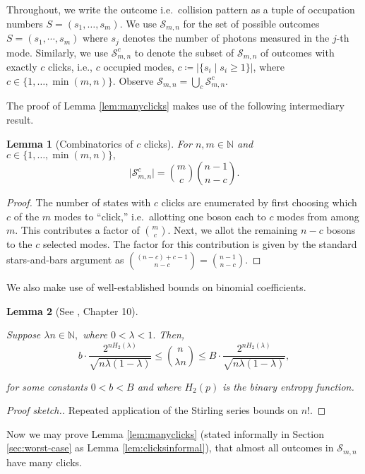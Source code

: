\documentclass[11pt]{article}
\theoremstyle{plain}
\theoremstyle{plain}
\newtheorem{lem}{Lemma}
\theoremstyle{plain}
\theoremstyle{plain}
\theoremstyle{plain}
\theoremstyle{plain}
\theoremstyle{plain}
\theoremstyle{remark}
\theoremstyle{remark}
\theoremstyle{plain}
\theoremstyle{plain}
\theoremstyle{plain}
\theoremstyle{plain}
\newcommand{\Scmn}{\mathcal{S}^c_{m,n}}
\begin{document}
Throughout, we write the outcome i.e.\ collision pattern as a tuple of occupation numbers $S = (s_1,\ldots,s_m).$ 
We use $\mathcal S_{m,n}$ for the set of possible outcomes $S=(s_1,\cdots,s_m)$ where $s_j$ denotes the number of photons measured in the $j$-th mode. Similarly, we use $\mathcal{S}^c_{m,n}$ to denote the subset of $\mathcal{S}_{m,n}$ of outcomes with exactly $c$ clicks, i.e., $c$ occupied modes, $c \coloneqq \lvert \{s_i \mid s_i\geq 1\}\rvert $, where $c\in\{1,\ldots,\min(m,n)\}.$ Observe $\mathcal{S}_{m,n} = \bigcup_{c} \mathcal{S}^c_{m,n}.$

The proof of Lemma \ref{lem:manyclicks} makes use of the following intermediary result.

\begin{lem}[Combinatorics of $c$ clicks]\label{lem:states-with-c-clicks}
    For $n,m \in \mathbb{N}$ and $c\in\{1,\ldots,\min(m,n)\},$ \[\lvert \Scmn \rvert = \binom{m}{c} \binom{n-1}{n-c}.\]
\end{lem}

\begin{proof}
The number of states with $c$ clicks are enumerated by first choosing which $c$ of the $m$ modes to ``click,'' i.e.\ allotting one boson each to $c$ modes from among $m.$ This contributes a factor of $\binom{m}{c}.$ Next, we allot the remaining $n-c$ bosons to the $c$ selected modes. The factor for this contribution is given by the standard stars-and-bars argument as $\binom{(n-c)+ c - 1}{n - c} = \binom{n-1}{n-c}.$
\end{proof}

We also make use of well-established bounds on binomial coefficients.

\begin{lem}[See \cite{MacWilliams}, Chapter 10]\label{lem:binomial-bounds}

Suppose $\lambda n \in \mathbb{N},$ where $0<\lambda < 1.$ Then, 
    \[b \cdot \frac{2^{nH_2(\lambda)}}{\sqrt{n\lambda(1-\lambda)}} \leq \binom{n}{\lambda n} \leq B \cdot \frac{2^{nH_2(\lambda)}}{\sqrt{n\lambda(1-\lambda)}},
    \]

    for some constants $0<b<B$ and where $H_2(p)$ is the binary entropy function. 
\end{lem}

\begin{proof}[Proof sketch.]
    Repeated application of the Stirling series bounds on $n!.$
\end{proof}

Now we may prove Lemma \ref{lem:manyclicks} (stated informally in Section \ref{sec:worst-case} as Lemma \ref{lem:clicksinformal}), that almost all outcomes in $\mathcal S_{m,n}$ have many clicks.
\end{document}

